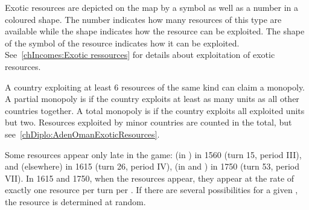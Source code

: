 \aparag Exotic resources are depicted on the \ROTW map by a symbol as well as
a number in a coloured shape. The number indicates how many resources of this
type are available while the shape indicates how the resource can be
exploited.
\bparag The shape of the symbol of the resource indicates how it can be
exploited. See~\ref{chIncomes:Exotic ressources} for details about
exploitation of exotic resources.

\label{chThePowers:MonopolyExoticResources}
A country exploiting at least 6 resources of the same kind can claim a
monopoly.
\bparag A partial monopoly is if the country exploits at least as many units
as all other countries together.
\bparag A total monopoly is if the country exploits all exploited units but
two.
\bparag Resources exploited by minor countries are counted in the total, but
see~\ref{chDiplo:AdenOmanExoticResources}.

\label{chThePowers:LateResources} Some
resources appear only late in the game:  (in ) in
1560 (turn 15, period III),  and 
(elsewhere) in 1615 (turn 26, period IV),  (in 
and ) in 1750 (turn 53, period VII).
\bparag In 1615 and 1750, when the resources appear, they appear at the rate
of exactly one resource per turn per \Area. If there are several possibilities
for a given \Area, the resource is determined at random.

